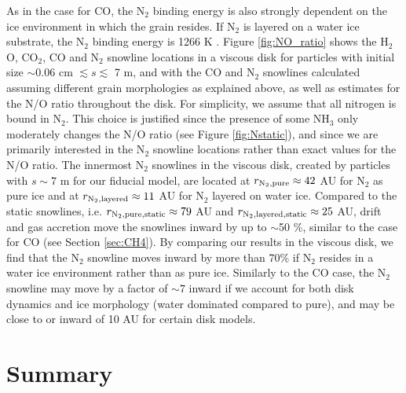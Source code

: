 \documentclass[apj]{emulateapj}
\newcommand{\emgr}[1]{\emph{ \color{gray} #1}}
\begin{document}
As in the case for CO, the N$_2$ binding energy is also strongly dependent on the ice environment in which the grain resides. If N$_2$ is layered on a water ice substrate, the N$_2$ binding energy is 1266 K \citep{fayolle16}. Figure \ref{fig:NO_ratio} shows the H$_2$O, CO$_2$, CO and N$_2$ snowline locations in a viscous disk for particles with initial size $\sim0.06$ cm $\lesssim s \lesssim$ 7 m, and with the CO and N$_2$ snowlines calculated assuming different grain morphologies as explained above, as well as estimates for the N/O ratio throughout the disk. For simplicity, we assume that all nitrogen is bound in N$_2$. This choice is justified since the presence of some NH$_3$ only moderately changes the N/O ratio (see Figure \ref{fig:Nstatic}), and since we are primarily interested in the N$_2$ snowline locations rather than exact values for the N/O ratio. The innermost N$_2$ snowlines in the viscous disk, created by particles with $s \sim 7$ m for our fiducial model, are located at $r_{\rm N_2, pure} \approx 42$ AU for N$_2$ as pure ice and at $r_{\rm N_2, layered} \approx 11$ AU for N$_2$ layered on water ice. Compared to the static snowlines, i.e. $r_{\rm N_2, pure, static} \approx 79$ AU and $r_{\rm N_2, layered, static} \approx 25$ AU, drift and gas accretion move the snowlines inward by up to $\sim$50 \%, similar to the case for CO (see Section \ref{sec:CH4}). By comparing our results in the viscous disk, we find that the N$_2$ snowline moves inward by more than 70\% if N$_2$ resides in a water ice environment rather than as pure ice. Similarly to the CO case, the N$_2$ snowline may move by a factor of $\sim$$7$ inward if we account for both disk dynamics and ice morphology (water dominated compared to pure), and may be close to or inward of 10 AU for certain disk models. 







\section{Summary}
\label{sec:summary}
\end{document}
